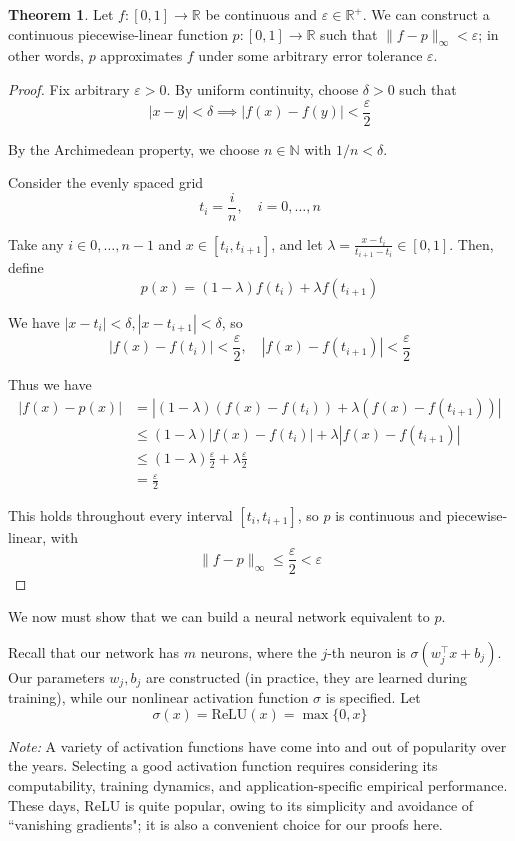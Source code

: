 \documentclass{article}
\theoremstyle{definition}
\newtheorem{theorem}{Theorem}
\newcommand{\note}{\textit{Note: }}
\begin{document}
\begin{theorem}
Let $f : [0, 1] \to \mathbb{R}$ be continuous and $\varepsilon \in \mathbb{R}^+$. We can construct a continuous piecewise-linear function $p : [0, 1] \to \mathbb{R}$ such that $\|f-p\|_\infty < \varepsilon$; in other words, $p$ approximates $f$ under some arbitrary error tolerance $\varepsilon$. 
\end{theorem}
\begin{proof}
Fix arbitrary $\varepsilon > 0$. By uniform continuity, choose $\delta > 0$ such that
$$|x - y| < \delta \implies |f(x) - f(y)| < \frac{\varepsilon}{2}$$

By the Archimedean property, we choose $n \in \mathbb{N}$ with $1/n < \delta$.

Consider the evenly spaced grid
$$t_i = \frac{i}{n},\quad i = 0, \dots, n$$

Take any $i \in 0, \dots, n-1$ and $x \in [t_i, t_{i+1}]$, and let $\lambda = \frac{x-t_i}{t_{i+1} - t_i} \in [0, 1]$. Then, define
$$p(x) = (1 - \lambda)f(t_i) + \lambda f(t_{i+1})$$

We have $|x - t_i| < \delta, |x - t_{i+1}| < \delta$, so
$$|f(x)-f(t_i)| < \frac{\varepsilon}{2}, \quad |f(x)-f(t_{i+1})| < \frac{\varepsilon}{2}$$

Thus we have
\begin{align*}
    |f(x) - p(x)| &= |(1 - \lambda)(f(x)-f(t_i)) + \lambda(f(x)-f(t_{i+1}))| \\
    &\le (1-\lambda)|f(x)-f(t_i)| + \lambda|f(x)-f(t_{i+1})| \\
    &\le (1-\lambda)\frac{\varepsilon}{2} + \lambda \frac{\varepsilon}{2} \\
    &= \frac{\varepsilon}{2}
\end{align*}

This holds throughout every interval $[t_i, t_{i+1}]$, so $p$ is continuous and piecewise-linear, with
$$\|f-p\|_\infty \le \frac{\varepsilon}{2} < \varepsilon$$
\end{proof}

We now must show that we can build a neural network equivalent to $p$.

Recall that our network has $m$ neurons, where the $j$-th neuron is $\sigma(w^\top_j x + b_j)$. Our parameters $w_j, b_j$ are constructed (in practice, they are learned during training), while our nonlinear activation function $\sigma$ is specified. 
Let
$$\sigma(x) = \text{ReLU}(x) = \max\{0, x\}$$

\begin{aside}
\note A variety of activation functions have come into and out of popularity over the years. Selecting a good activation function requires considering its computability, training dynamics, and application-specific empirical performance. These days, ReLU is quite popular, owing to its simplicity and avoidance of ``vanishing gradients"; it is also a convenient choice for our proofs here.

\end{aside}
\end{document}
